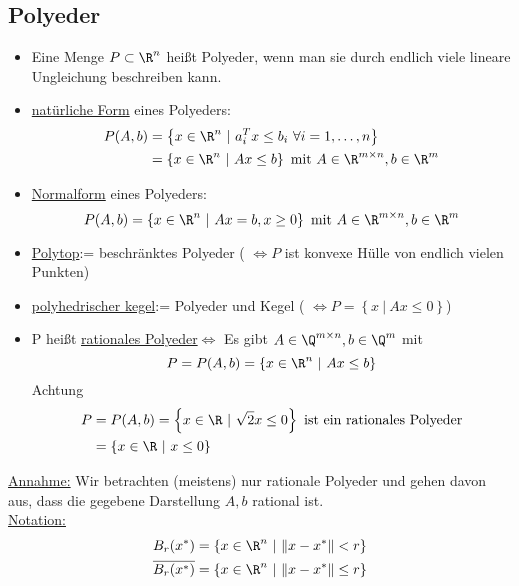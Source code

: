 \subsection{Polyeder}
\begin{definition}
	\begin{itemize}\
		\item Eine Menge $P\subset \R^n$ heißt Polyeder, wenn man sie durch endlich viele lineare Ungleichung beschreiben kann.
		\item \underline{natürliche Form} eines Polyeders:
			\begin{align*}
				P(A,b) &= \left\{ x \in \R^n\ | \ a^{T}_{i} x \leq b_{i} \ \forall i =1,\dots ,n \right\}\\
					   &= \left\{ x \in \R^n \ | \ Ax \leq b \right\} \text{ mit } A \in\R^{m\times n}, b\in \R^m
			\end{align*}
		\item \underline{Normalform} eines Polyeders:
			\begin{equation*}
				P(A,b) = \left\{ x \in \R^n \ | \ Ax = b, x\geq 0 \right\} \text{ mit } A \in\R^{m\times n}, b\in \R^m
			\end{equation*}
		\item \underline{Polytop}:= beschränktes Polyeder ( $\iff P$ ist konvexe Hülle von endlich vielen Punkten)	
		\item \underline{polyhedrischer kegel}:= Polyeder und Kegel ( $\iff P = \left\{x \ | \ Ax \leq 0 \right\}$)
		\item P heißt \underline{rationales Polyeder}$\iff$ Es gibt $A\in\Q^{m \times n}, b \in \Q^m$ mit
			\begin{equation*}
				P = P(A,b) = \left\{ x \in \R^n\ | \ Ax \leq b \right\}
			\end{equation*}
			Achtung
			\begin{align*}
				P &= P(A,b) = \left\{ x \in \R\ | \ \sqrt{2}x \leq 0 \right\} \text{ ist ein rationales Polyeder}\\
				  &= \left\{x \in \R \ | \ x \leq 0  \right\}
			\end{align*}
	\end{itemize}
\end{definition}
\underline{Annahme:} Wir betrachten (meistens) nur rationale Polyeder und gehen davon aus, dass die gegebene Darstellung $A,b$ rational ist.\\
\underline{Notation:}
\begin{align*}
	B_{r}(x^*) &= \left\{ x \in \R^n \ | \ \|x - x^*\|<r \right\}\\
	\overline{B_{r}(x^*)} &= \left\{ x \in \R^n \ | \ \|x - x^*\|\leq r \right\}
\end{align*}
